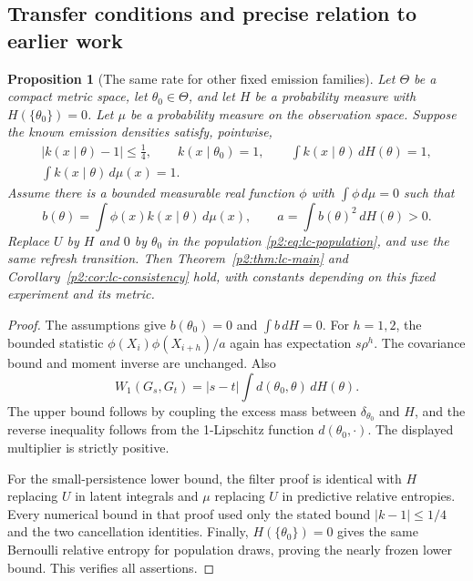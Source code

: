 \documentclass[11pt,a4paper]{article}
\newtheorem{proposition}[theorem]{Proposition}
\theoremstyle{definition}
\theoremstyle{remark}
\numberwithin{equation}{section}
\begin{document}
\subsection{Transfer conditions and precise relation to earlier work}

\begin{proposition}[The same rate for other fixed emission families]
\label{p2:prop:lc-general-kernel}
Let $\Theta$ be a compact metric space, let $\theta_0\in\Theta$, and let
$H$ be a probability measure with $H(\{\theta_0\})=0$.  Let $\mu$ be a
probability measure on the observation space.  Suppose the known emission
densities satisfy, pointwise,
\begin{gather*}
 |k(x\mid\theta)-1|\le\frac14,\qquad
 k(x\mid\theta_0)=1,\qquad
 \int k(x\mid\theta)\,dH(\theta)=1,\\
 \int k(x\mid\theta)\,d\mu(x)=1.
\end{gather*}
Assume there is a bounded measurable real function $\phi$ with
$\int\phi\,d\mu=0$ such that
\[
 b(\theta)=\int\phi(x)k(x\mid\theta)\,d\mu(x),\qquad
 a=\int b(\theta)^2\,dH(\theta)>0.
\]
Replace $U$ by $H$ and $0$ by $\theta_0$ in the population
\eqref{p2:eq:lc-population}, and use the same refresh transition.  Then
Theorem~\ref{p2:thm:lc-main} and Corollary~\ref{p2:cor:lc-consistency} hold, with
constants depending on this fixed experiment and its metric.
\end{proposition}
\begin{proof}
The assumptions give $b(\theta_0)=0$ and $\int b\,dH=0$.  For $h=1,2$,
the bounded statistic $\phi(X_i)\phi(X_{i+h})/a$ again has expectation
$s\rho^h$.  The covariance bound and moment inverse are
unchanged.  Also
\[
 W_1(G_s,G_t)
    =|s-t|\int d(\theta_0,\theta)\,dH(\theta).
\]
The upper bound follows by coupling the excess mass between $\delta_{\theta_0}$
and $H$, and the reverse inequality follows from the 1-Lipschitz function
$d(\theta_0,\cdot)$.  The displayed multiplier is strictly positive.

For the small-persistence lower bound, the filter proof is identical with
$H$ replacing $U$ in latent integrals and $\mu$ replacing $U$ in predictive
relative entropies.  Every numerical bound in that proof used only the stated
bound $|k-1|\le1/4$ and the two cancellation identities.  Finally,
$H(\{\theta_0\})=0$ gives the same Bernoulli relative entropy for population
draws, proving the nearly frozen lower bound.  This verifies all assertions.
\end{proof}
\end{document}
